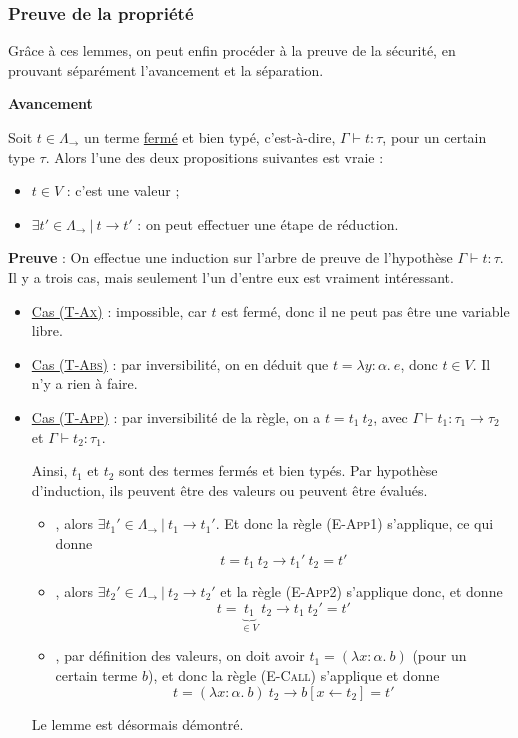 \documentclass[11pt]{article}
\begin{document}
\subsubsection{Preuve de la propriété}

Grâce à ces lemmes, on peut enfin procéder à la preuve de la sécurité, en prouvant séparément l'avancement et la séparation.

\begin{theorem}
    \textbf{Avancement}

    Soit $t\in\Lambda_\rightarrow$ un terme \underline{fermé} et bien typé, c'est-à-dire, $\Gamma\vdash t:\tau$, pour un certain type $\tau$. Alors l'une des deux propositions suivantes est vraie :
    \begin{itemize}
        \item $t\in V$ : c'est une valeur ;
        \item $\exists t'\in\Lambda_\rightarrow~|~t\longrightarrow t'$ : on peut effectuer une étape de réduction.
    \end{itemize}
\end{theorem}

\textbf{Preuve} : On effectue une induction sur l'arbre de preuve de l'hypothèse $\Gamma\vdash t:\tau$. Il y a trois cas, mais seulement l'un d'entre eux est vraiment intéressant.

\begin{itemize}
    \item \underline{Cas {(\scshape{T-Ax})}} : impossible, car $t$ est fermé, donc il ne peut pas être une variable libre.
    \item \underline{Cas {(\scshape{T-Abs})}} : par inversibilité, on en déduit que $t=\lambda y:\alpha.~e$, donc $t\in V$. Il n'y a rien à faire.
    \item \underline{Cas {(\scshape{T-App})}} : par inversibilité de la règle, on a $t=t_1~t_2$, avec $\Gamma\vdash t_1:\tau_1\to\tau_2$ et $\Gamma\vdash t_2:\tau_1$.
    
    Ainsi, $t_1$ et $t_2$ sont des termes fermés et bien typés. Par hypothèse d'induction, ils peuvent être des valeurs ou peuvent être évalués.
    \begin{itemize}
        \item {}, alors $\exists t_1'\in\Lambda_\rightarrow~|~t_1\rightarrow t_1'$. Et donc la règle {(\scshape{E-App1})} s'applique, ce qui donne $$t=t_1~t_2\longrightarrow t_1'~t_2=t'$$
        \item {}, alors  $\exists t_2'\in\Lambda_\rightarrow~|~t_2\rightarrow t_2'$ et la règle {(\scshape{E-App2})} s'applique donc, et donne $$t=\underbrace{t_1}_{\in V}~t_2\longrightarrow t_1~t_2'=t'$$
        \item {}, par définition des valeurs, on doit avoir $t_1=(\lambda x:\alpha.~b)$ (pour un certain terme $b$), et donc la règle {(\scshape{E-Call})} s'applique et donne
        $$t=(\lambda x:\alpha.~b)~t_2\longrightarrow b[x\leftarrow t_2]=t'$$
    \end{itemize}

    Le lemme est désormais démontré.
\end{itemize}
\end{document}
